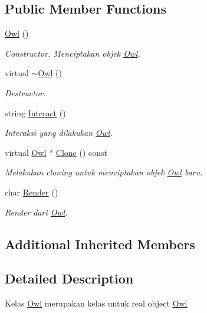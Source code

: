 \subsection*{Public Member Functions}
\begin{DoxyCompactItemize}
\item 
\hyperlink{classOwl_a0a5c549eb9ac3099f04dbcea78c79f6a}{Owl} ()
\begin{DoxyCompactList}\small\item\em Constructor. Menciptakan objek \hyperlink{classOwl}{Owl}. \end{DoxyCompactList}\item 
virtual \hyperlink{classOwl_af8238b610fbfd53c4d3153fb2d993ab7}{$\sim$\+Owl} ()
\begin{DoxyCompactList}\small\item\em Destructor. \end{DoxyCompactList}\item 
string \hyperlink{classOwl_ac3c735f8a34b46780a0efd052319e7f3}{Interact} ()
\begin{DoxyCompactList}\small\item\em Interaksi yang dilakukan \hyperlink{classOwl}{Owl}. \end{DoxyCompactList}\item 
virtual \hyperlink{classOwl}{Owl} $\ast$ \hyperlink{classOwl_a585e73d53d76b2db489613b7f0b6eecc}{Clone} () const 
\begin{DoxyCompactList}\small\item\em Melakukan cloning untuk menciptakan objek \hyperlink{classOwl}{Owl} baru. \end{DoxyCompactList}\item 
char \hyperlink{classOwl_ab4ecc1fc8da822f97299709508f7806d}{Render} ()
\begin{DoxyCompactList}\small\item\em Render dari \hyperlink{classOwl}{Owl}. \end{DoxyCompactList}\end{DoxyCompactItemize}
\subsection*{Additional Inherited Members}


\subsection{Detailed Description}
Kelas \hyperlink{classOwl}{Owl} merupakan kelas untuk real object \hyperlink{classOwl}{Owl} 

